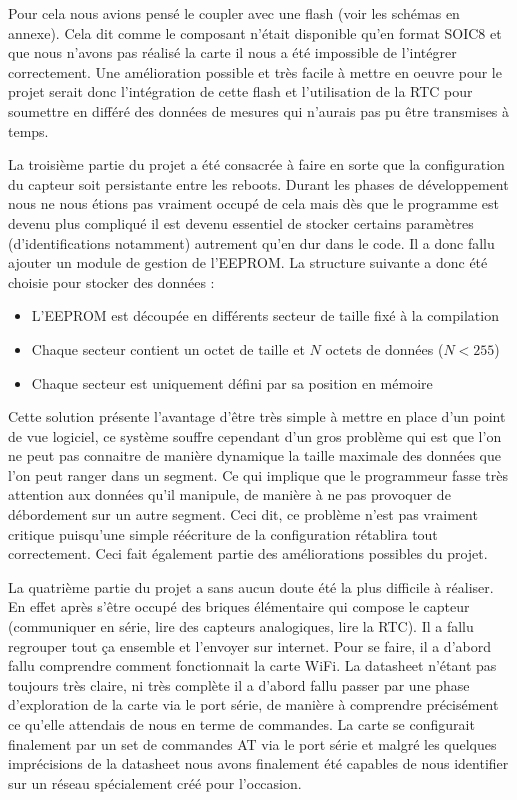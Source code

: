 		Pour cela nous avions pensé le coupler avec une flash (voir les schémas en annexe). Cela dit
		comme le composant n'était disponible qu'en format SOIC8 et que nous n'avons pas réalisé la carte
		il nous a été impossible de l'intégrer correctement. Une amélioration possible et très facile à
		mettre en oeuvre pour le projet serait donc l'intégration de cette flash et l'utilisation
		de la RTC pour soumettre en différé des données de mesures qui n'aurais pas pu être
		transmises à temps.
		\par
		La troisième partie du projet a été consacrée à faire en sorte que la configuration du capteur
		soit persistante entre les reboots. Durant les phases de développement nous ne nous étions pas
		vraiment occupé de cela mais dès que le programme est devenu plus compliqué il est devenu
		essentiel de stocker certains paramètres (d'identifications notamment) autrement qu'en dur
		dans le code. Il a donc fallu ajouter un module de gestion de l'EEPROM. La structure suivante a donc
		été choisie pour stocker des données :
		\begin{itemize}
			\item L'EEPROM est découpée en différents secteur de taille fixé à la compilation
			\item Chaque secteur contient un octet de taille et $N$ octets de données ($N < 255$)
			\item Chaque secteur est uniquement défini par sa position en mémoire
		\end{itemize}
		
		Cette solution présente l'avantage d'être très simple à mettre en place d'un point de vue
		logiciel, ce système souffre cependant d'un gros problème qui est que l'on ne peut
		pas connaitre de manière dynamique la taille maximale des données que l'on peut ranger
		dans un segment. Ce qui implique que le programmeur fasse très attention aux données qu'il
		manipule, de manière à ne pas provoquer de débordement sur un autre segment. Ceci dit,
		ce problème n'est pas vraiment critique puisqu'une simple réécriture de la configuration
		rétablira tout correctement. Ceci fait également partie des améliorations possibles
		du projet.
		
		\par
		La quatrième partie du projet a sans aucun doute été la plus difficile à réaliser. En
		effet après s'être occupé des briques élémentaire qui compose le capteur (communiquer
		en série, lire des capteurs analogiques, lire la RTC). Il a fallu regrouper tout ça
		ensemble et l'envoyer sur internet. Pour se faire, il a d'abord fallu comprendre comment
		fonctionnait la carte WiFi. La datasheet n'étant pas toujours très claire, ni très complète
		il a d'abord fallu passer par une phase \og{} d'exploration \fg{} de la carte via le port
		série, de manière à comprendre précisément ce qu'elle attendais de nous en terme de commandes.
		La carte se configurait finalement par un set de commandes AT via le port série et malgré
		les quelques imprécisions de la datasheet nous avons finalement été capables de nous identifier
		sur un réseau spécialement créé pour l'occasion.
		
